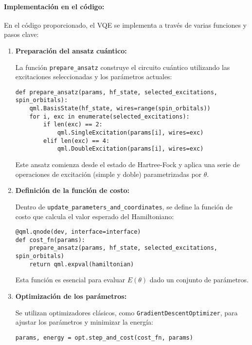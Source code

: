 \paragraph{Implementación en el código:}

En el código proporcionado, el VQE se implementa a través de varias funciones y pasos clave:

\begin{enumerate}
    \item \textbf{Preparación del ansatz cuántico:}
    
    La función \texttt{prepare\_ansatz} construye el circuito cuántico utilizando las excitaciones seleccionadas y los parámetros actuales:
    
    \begin{verbatim}
def prepare_ansatz(params, hf_state, selected_excitations, spin_orbitals):
    qml.BasisState(hf_state, wires=range(spin_orbitals))
    for i, exc in enumerate(selected_excitations):
        if len(exc) == 2:
            qml.SingleExcitation(params[i], wires=exc)
        elif len(exc) == 4:
            qml.DoubleExcitation(params[i], wires=exc)
    \end{verbatim}
    
    Este ansatz comienza desde el estado de Hartree-Fock y aplica una serie de operaciones de excitación (simple y doble) parametrizadas por \( \theta \).
    
    \item \textbf{Definición de la función de costo:}
    
    Dentro de \texttt{update\_parameters\_and\_coordinates}, se define la función de costo que calcula el valor esperado del Hamiltoniano:
    
    \begin{verbatim}
@qml.qnode(dev, interface=interface)
def cost_fn(params):
    prepare_ansatz(params, hf_state, selected_excitations, spin_orbitals)
    return qml.expval(hamiltonian)
    \end{verbatim}
    
    Esta función es esencial para evaluar \( E(\theta) \) dado un conjunto de parámetros.
    
    \item \textbf{Optimización de los parámetros:}
    
    Se utilizan optimizadores clásicos, como \texttt{GradientDescentOptimizer}, para ajustar los parámetros y minimizar la energía:
    
    \begin{verbatim}
params, energy = opt.step_and_cost(cost_fn, params)
    \end{verbatim}
    

\end{enumerate}
